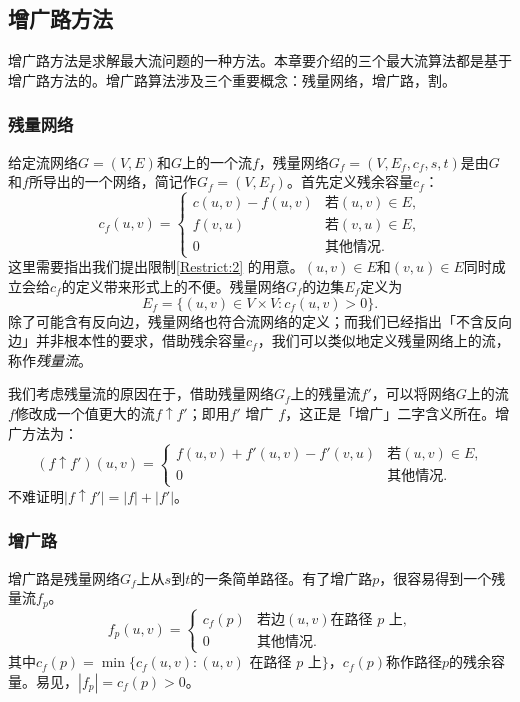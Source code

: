 \documentclass{ctexbook}
\begin{document}
    \subsection{增广路方法}
    增广路方法是求解最大流问题的一种方法。本章要介绍的三个最大流算法都是基于增广路方法的。增广路算法涉及三个重要概念：残量网络，增广路，割。
    \subsubsection*{残量网络}
    给定流网络$G=(V,E)$和$G$上的一个流$f$，残量网络$G_f=(V,E_f,c_f, s, t)$是由$G$和$f$所导出的一个网络，简记作$G_f=(V,E_f)$。首先定义残余容量$c_f$：
    \[
    c_f(u,v) =
    \begin{cases}
        c(u,v) - f(u,v) & \text{若$(u,v)\in E$,}\\
        f(v,u) & \text{若$(v,u)\in E$,} \\
        0 & \text{其他情况.}
    \end{cases}
    \]
    这里需要指出我们提出限制\ref{Restrict:2} 的用意。$(u,v)\in E$和$(v,u)\in E$同时成立会给$c_f$的定义带来形式上的不便。残量网络$G_f$的边集$E_f$定义为
    \[
    E_f = \{(u,v)\in V\times V\colon c_f(u,v)>0\}.
    \]
    除了可能含有反向边，残量网络也符合流网络的定义；而我们已经指出「不含反向边」并非根本性的要求，借助残余容量$c_f$，我们可以类似地定义残量网络上的流，称作\emph{残量流}。

    我们考虑残量流的原因在于，借助残量网络$G_f$上的残量流$f'$，可以将网络$G$上的流$f$修改成一个值更大的流$f\uparrow f'$；即用$f'$ 增广 $f$，这正是「增广」二字含义所在。增广方法为：
    \[
    (f\uparrow f')(u,v) =\begin{cases}
    f(u,v) + f'(u,v) - f'(v,u) & \text{若$(u,v)\in E$,} \\
    0 & \text{其他情况.}
\end{cases}
    \]
    不难证明$|f\uparrow f'| = |f| + |f'|$。
    \subsubsection{增广路}
    增广路是残量网络$G_f$上从$s$到$t$的一条简单路径。有了增广路$p$，很容易得到一个残量流$f_p$。
    \[
    f_p(u,v) =\begin{cases}
    c_f(p) & \text{若边$(u,v)$在路径 $p$ 上,}\\
    0 & \text{其他情况.}
\end{cases}
    \]
    其中$c_f(p) = \min\{c_f(u,v)\colon (u,v)\text{ 在路径 }p\text{ 上} \}$，$c_f(p)$称作路径$p$的残余容量。易见，$|f_p| = c_f(p) > 0$。
\end{document}
